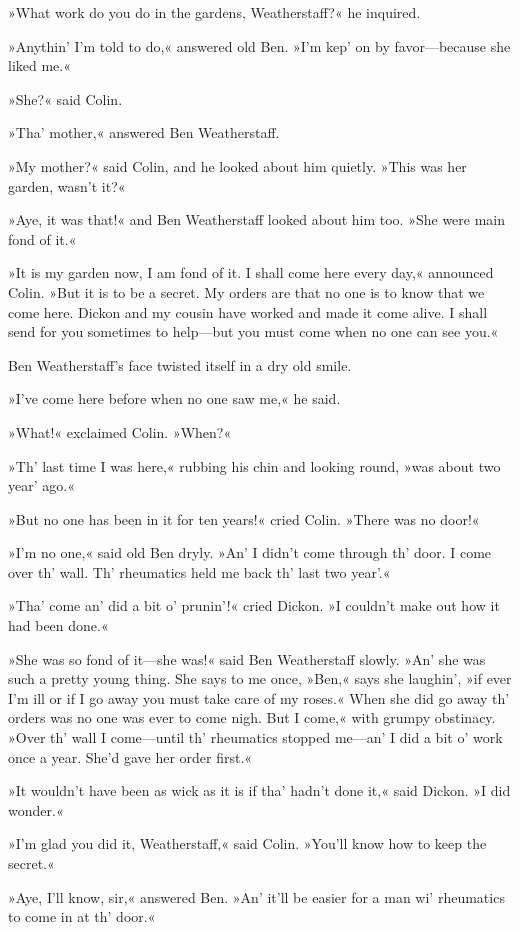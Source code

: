 »What work do you do in the gardens, Weatherstaff?« he inquired.

»Anythin' I'm told to do,« answered old Ben. »I'm kep' on by favor—because she liked me.«

»She?« said Colin.

»Tha' mother,« answered Ben Weatherstaff.

»My mother?« said Colin, and he looked about him quietly. »This was her garden, wasn't it?«

»Aye, it was that!« and Ben Weatherstaff looked about him too. »She were main fond of it.«

»It is my garden now, I am fond of it. I shall come here every day,« announced Colin. »But it is to be a secret. My orders are that no one is to know that we come here. Dickon and my cousin have worked and made it come alive. I shall send for you sometimes to help—but you must come when no one can see you.«

Ben Weatherstaff's face twisted itself in a dry old smile.

»I've come here before when no one saw me,« he said.

»What!« exclaimed Colin. »When?«

»Th' last time I was here,« rubbing his chin and looking round, »was about two year' ago.«

»But no one has been in it for ten years!« cried Colin. »There was no door!«

»I'm no one,« said old Ben dryly. »An' I didn't come through th' door. I come over th' wall. Th' rheumatics held me back th' last two year'.«

»Tha' come an' did a bit o' prunin'!« cried Dickon. »I couldn't make out how it had been done.«

»She was so fond of it—she was!« said Ben Weatherstaff slowly. »An' she was such a pretty young thing. She says to me once, »Ben,« says she laughin', »if ever I'm ill or if I go away you must take care of my roses.« When she did go away th' orders was no one was ever to come nigh. But I come,« with grumpy obstinacy. »Over th' wall I come—until th' rheumatics stopped me—an' I did a bit o' work once a year. She'd gave her order first.«

»It wouldn't have been as wick as it is if tha' hadn't done it,« said Dickon. »I did wonder.«

»I'm glad you did it, Weatherstaff,« said Colin. »You'll know how to keep the secret.«

»Aye, I'll know, sir,« answered Ben. »An' it'll be easier for a man wi' rheumatics to come in at th' door.«

